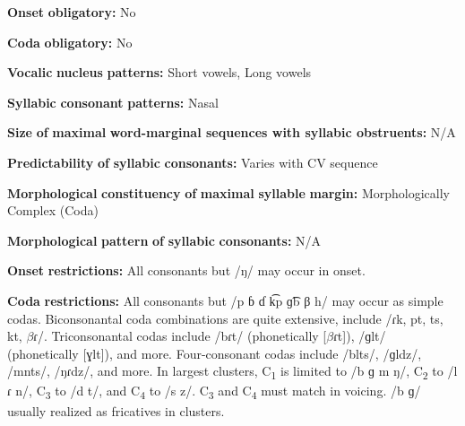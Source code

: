 \documentclass[output=paper]{langsci/langscibook}
\begin{document}
\begin{styleBody}
\textbf{Onset} \textbf{obligatory:} No
\end{styleBody}

\begin{styleBody}
\textbf{Coda} \textbf{obligatory:} No
\end{styleBody}

\begin{styleBody}
\textbf{Vocalic} \textbf{nucleus} \textbf{patterns:} Short vowels, Long vowels
\end{styleBody}

\begin{styleBody}
\textbf{Syllabic} \textbf{consonant} \textbf{patterns:} Nasal
\end{styleBody}

\begin{styleBody}
\textbf{Size} \textbf{of} \textbf{maximal} \textbf{word{}-marginal sequences with syllabic obstruents:} N/A
\end{styleBody}

\begin{styleBody}
\textbf{Predictability} \textbf{of} \textbf{syllabic} \textbf{consonants:} Varies with CV sequence
\end{styleBody}

\begin{styleBody}
\textbf{Morphological} \textbf{constituency} \textbf{of} \textbf{maximal} \textbf{syllable} \textbf{margin:} Morphologically Complex (Coda)
\end{styleBody}

\begin{styleBody}
\textbf{Morphological} \textbf{pattern} \textbf{of} \textbf{syllabic} \textbf{consonants:} N/A
\end{styleBody}

\begin{styleBody}
\textbf{Onset} \textbf{restrictions:} All consonants but /ŋ/ may occur in onset.
\end{styleBody}

\begin{styleBody}
\textbf{Coda} \textbf{restrictions:} All consonants but /p ɓ ɗ k͡p ɡ͡b β h/ may occur as simple codas. Biconsonantal coda combinations are quite extensive, include /ɾk, pt, ts, kt, $\beta ɾ$/. Triconsonantal codas include /bɾt/ (phonetically [$\beta ɾ$t]), /ɡlt/ (phonetically [ɣlt]), and more. Four-consonant codas include /blts/, /ɡldz/, /mnts/, /ŋɾdz/, and more. In largest clusters, C\textsubscript{1} is limited to /b ɡ m ŋ/, C\textsubscript{2} to /l ɾ n/, C\textsubscript{3} to /d t/, and C\textsubscript{4} to /s z/. C\textsubscript{3} and C\textsubscript{4} must match in voicing. /b ɡ/ usually realized as fricatives in clusters.
\end{styleBody}
\end{document}
